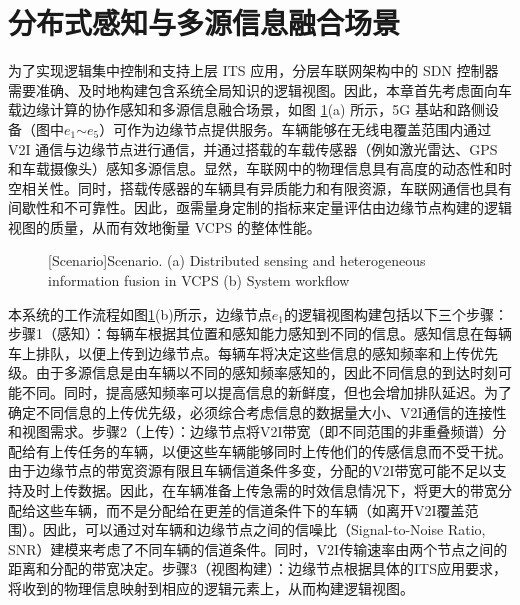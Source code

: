 \section{分布式感知与多源信息融合场景}\label{section 2-3}

为了实现逻辑集中控制和支持上层 ITS 应用，分层车联网架构中的 SDN 控制器需要准确、及时地构建包含系统全局知识的逻辑视图。因此，本章首先考虑面向车载边缘计算的协作感知和多源信息融合场景，如图 \ref{fig 2-2}(a) 所示，5G 基站和路侧设备（图中$e_1$$\sim$$e_5$）可作为边缘节点提供服务。车辆能够在无线电覆盖范围内通过 V2I 通信与边缘节点进行通信，并通过搭载的车载传感器（例如激光雷达、GPS 和车载摄像头）感知多源信息。显然，车联网中的物理信息具有高度的动态性和时空相关性。同时，搭载传感器的车辆具有异质能力和有限资源，车联网通信也具有间歇性和不可靠性。因此，亟需量身定制的指标来定量评估由边缘节点构建的逻辑视图的质量，从而有效地衡量 VCPS 的整体性能。

\begin{figure}[h]
     \centering
     [Scenario]{Scenario. (a) Distributed sensing and heterogeneous information fusion in VCPS (b) System workflow}
     \label{fig 2-2}
\end{figure}

本系统的工作流程如图\ref{fig 2-2}(b)所示，边缘节点$e_1$的逻辑视图构建包括以下三个步骤：步骤1（感知）：每辆车根据其位置和感知能力感知到不同的信息。感知信息在每辆车上排队，以便上传到边缘节点。每辆车将决定这些信息的感知频率和上传优先级。由于多源信息是由车辆以不同的感知频率感知的，因此不同信息的到达时刻可能不同。同时，提高感知频率可以提高信息的新鲜度，但也会增加排队延迟。为了确定不同信息的上传优先级，必须综合考虑信息的数据量大小、V2I通信的连接性和视图需求。步骤2（上传）：边缘节点将V2I带宽（即不同范围的非重叠频谱）分配给有上传任务的车辆，以便这些车辆能够同时上传他们的传感信息而不受干扰。由于边缘节点的带宽资源有限且车辆信道条件多变，分配的V2I带宽可能不足以支持及时上传数据。因此，在车辆准备上传急需的时效信息情况下，将更大的带宽分配给这些车辆，而不是分配给在更差的信道条件下的车辆（如离开V2I覆盖范围）。因此，可以通过对车辆和边缘节点之间的信噪比（Signal-to-Noise Ratio, SNR）建模来考虑了不同车辆的信道条件。同时，V2I传输速率由两个节点之间的距离和分配的带宽决定。步骤3（视图构建）：边缘节点根据具体的ITS应用要求，将收到的物理信息映射到相应的逻辑元素上，从而构建逻辑视图。

